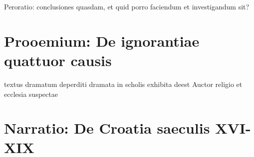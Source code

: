 \documentclass[14pt]{beamer}
\begin{document}
\begin{frame}
  Peroratio: conclusiones quasdam, et quid porro faciendum et investigandum sit?
  
\end{frame}

\section{Prooemium: De ignorantiae quattuor causis}

\begin{frame}
  textus dramatum deperditi
  dramata in scholis exhibita
  deest Auctor
  religio et ecclesia suspectae
  
\end{frame}

\section{Narratio: De Croatia saeculis XVI-XIX}

{
    \begin{frame}[plain]
    \end{frame}
    }

{
    \begin{frame}[plain]
    \end{frame}
    }
\end{document}
